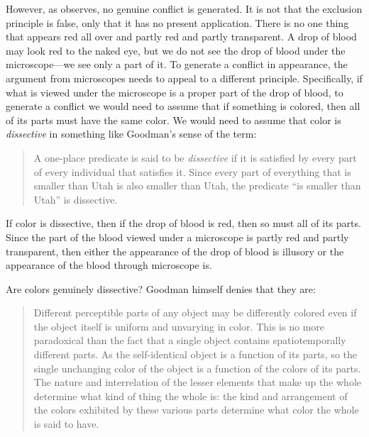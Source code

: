 \documentclass[12pt]{article}
\begin{document}
However, as \citet{Hilbert:1987jq} observes, no genuine conflict is generated. It is not that the exclusion principle is false, only that it has no present application. There is no one thing that appears red all over and partly red and partly transparent. A drop of blood may look red to the naked eye, but we do not see the drop of blood under the microscope---we see only a part of it. To generate a conflict in appearance, the argument from microscopes needs to appeal to a different principle. Specifically, if what is viewed under the microscope is a proper part of the drop of blood, to generate a conflict we would need to assume that if something is colored, then all of its parts must have the same color. We would need to assume that color is \emph{dissective} in something like Goodman's sense of the term:
\begin{quote}
	A one-place predicate is said to be \emph{dissective} if it is satisfied by every part of every individual that satisfies it. Since every part of everything that is smaller than Utah is also smaller than Utah, the predicate ``is smaller than Utah'' is dissective. \citep[53]{Goodman:1951ww}
\end{quote}
If color is dissective, then if the drop of blood is red, then so must all of its parts. Since the part of the blood viewed under a microscope is partly red and partly transparent, then either the appearance of the drop of blood is illusory or the appearance of the blood through microscope is.

Are colors genuinely dissective? Goodman himself denies that they are:
\begin{quote}
	Different perceptible parts of any object may be differently colored even if the object itself is uniform and unvarying in color. This is no more paradoxical than the fact that a single object contains spatiotemporally different parts. As the self-identical object is a function of its parts, so the single unchanging color of the object is a function of the colors of its parts. The nature and interrelation of the lesser elements that make up the whole determine what kind of thing the whole is: the kind and arrangement of the colors exhibited by these various parts determine what color the whole is said to have. \citep[130]{Goodman:1951ww}
\end{quote}
\end{document}
